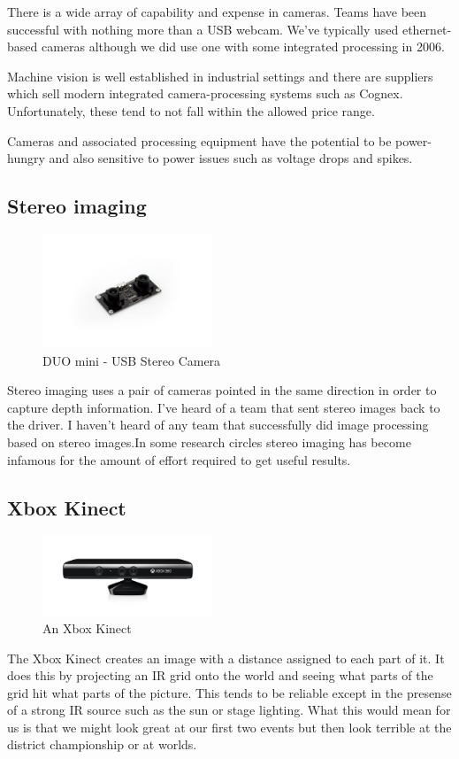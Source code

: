 \documentclass{article}
\begin{document}
There is a wide array of capability and expense in cameras.  Teams have been successful with nothing more than a USB webcam.  We've typically used ethernet-based cameras although we did use one with some integrated processing in 2006.  

Machine vision is well established in industrial settings and there are suppliers which sell modern integrated camera-processing systems such as Cognex.  Unfortunately, these tend to not fall within the allowed price range.  

Cameras and associated processing equipment have the potential to be power-hungry and also sensitive to power issues such as voltage drops and spikes.  

\subsection{Stereo imaging}
\begin{figure}[ht]
\centering
\includegraphics[width=2in]{stereo_camera.jpg}
\caption{DUO mini - USB Stereo Camera}
\end{figure}

Stereo imaging uses a pair of cameras pointed in the same direction in order to capture depth information.  I've heard of a team that sent stereo images back to the driver.  I haven't heard of any team that successfully did image processing based on stereo images.In some research circles stereo imaging has become infamous for the amount of effort required to get useful results.  

\subsection{Xbox Kinect}
\begin{figure}[ht]
\centering
\includegraphics[width=2in]{kinect.jpg}
\caption{An Xbox Kinect}
\end{figure}
The Xbox Kinect creates an image with a distance assigned to each part of it.  It does this by projecting an IR grid onto the world and seeing what parts of the grid hit what parts of the picture.  This tends to be reliable except in the presense of a strong IR source such as the sun or stage lighting.  What this would mean for us is that we might look great at our first two events but then look terrible at the district championship or at worlds.
\end{document}

